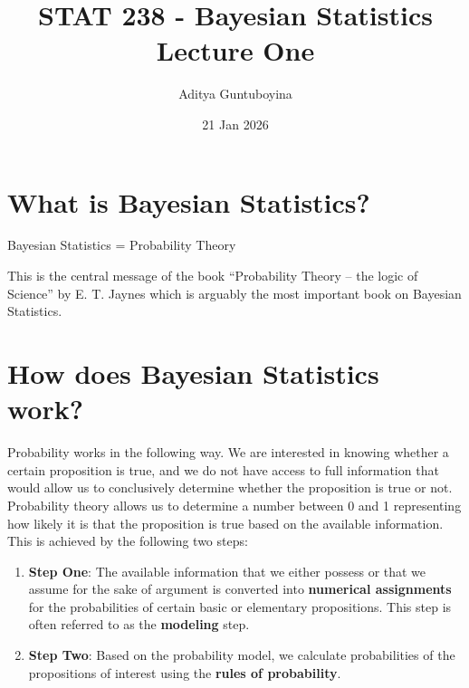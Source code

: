 \documentclass{scrartcl}
\begin{document}
\title{STAT 238 - Bayesian Statistics  \\
  Lecture One} 

\author{Aditya Guntuboyina}


\date{21 Jan 2026}

\maketitle

\section{What is Bayesian Statistics?}

Bayesian Statistics = Probability Theory

This is the central message of the book ``Probability Theory -- the
logic of Science'' by E. T. Jaynes which is arguably the most
important book on Bayesian Statistics. 

\section{How does Bayesian Statistics work?}

Probability works in the following way. We are interested in
knowing whether a certain 
proposition is true, and we do not have access to full
information that 
would allow us to conclusively determine whether the proposition is
true or not. Probability theory allows us to determine a number
between 0 and 1 representing how likely it is that the proposition is
true based on the available information. This is achieved by the
following two steps:
\begin{enumerate}
\item \textbf{Step One}: The available information that we either
  possess or that we assume for the sake of argument is converted
  into \textbf{numerical assignments} for the probabilities of certain
  basic or elementary propositions. This step is often referred to as
  the \textbf{modeling} step.
\item \textbf{Step Two}: Based on the probability model, we calculate
  probabilities of the propositions of interest using the
  \textbf{rules of probability}. 
\end{enumerate}
\end{document}
